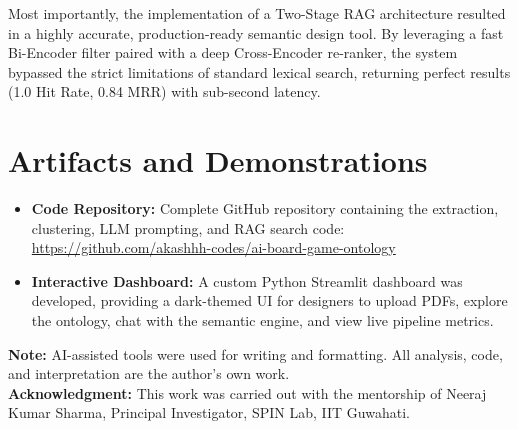 \documentclass{article}
\begin{document}
Most importantly, the implementation of a Two-Stage RAG architecture resulted in a highly accurate, production-ready semantic design tool. By leveraging a fast Bi-Encoder filter paired with a deep Cross-Encoder re-ranker, the system bypassed the strict limitations of standard lexical search, returning perfect results (1.0 Hit Rate, 0.84 MRR) with sub-second latency.

\section{Artifacts and Demonstrations}

\begin{itemize}[noitemsep]
    \item \textbf{Code Repository:} Complete GitHub repository containing the extraction, clustering, LLM prompting, and RAG search code:  
    \url{https://github.com/akashhh-codes/ai-board-game-ontology}
    \item \textbf{Interactive Dashboard:} A custom Python Streamlit dashboard was developed, providing a dark-themed UI for designers to upload PDFs, explore the ontology, chat with the semantic engine, and view live pipeline metrics.
\end{itemize}
\textbf{Note:} AI-assisted tools were used for writing and formatting. All analysis, code, and interpretation are the author's own work.
\\
\textbf{Acknowledgment:} This work was carried out with the mentorship of Neeraj Kumar Sharma, Principal Investigator, SPIN Lab, IIT Guwahati.

\clearpage
{\fontsize{8}{9}\selectfont

\nocite{*}

}
\end{document}
